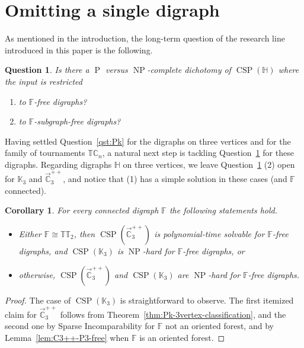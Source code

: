 \documentclass{article}
\newtheorem{corollary}[theorem]{Corollary}
\newtheorem{question}{Question}
\theoremstyle{definition}
\theoremstyle{remark}
\DeclareMathOperator{\NP}{NP}
\DeclareMathOperator{\cP}{P}
\DeclareMathOperator{\CSP}{CSP}
\newcommand{\bC}{{\mathbb C}}
\newcommand{\bF}{{\mathbb F}}
\newcommand{\bH}{{\mathbb H}}
\newcommand{\bK}{{\mathbb K}}
\newcommand{\bT}{{\mathbb T}}
\begin{document}
\section{Omitting a single digraph}
\label{sect:single-digraph}

As mentioned in the introduction, the long-term question of the research line introduced in 
this paper is the following.

\begin{question}\label{qst:long-term}
    Is there a $\cP$ versus $\NP$-complete dichotomy of $\CSP(\bH)$ where the input
    is restricted 
    \begin{enumerate}
        \item to $\bF$-free digraphs?
        \item to $\bF$-subgraph-free digraphs?
    \end{enumerate}
\end{question}

Having settled  Question~\ref{qst:Pk} for the digraphs on three vertices
and for the family of tournaments $\bT\bC_n$, a natural next step
is tackling Question~\ref{qst:long-term} for these digraphs.
Regarding digraphs $\bH$ on three vertices, we leave Question~\ref{qst:long-term} (2) 
open for $\bK_3$ and $\vec{\bC}_3^{++}$, and notice that (1) has a simple solution in
these cases (and $\bF$ connected). 



\begin{corollary}
    For every connected digraph $\bF$ the following statements hold.
    \begin{itemize}
        \item Either $\bF \cong \bT\bT_2$, then $\CSP(\vec{\bC}_3^{++})$ is polynomial-time solvable
        for $\bF$-free digraphs, and $\CSP(\bK_3)$ is $\NP$-hard for $\bF$-free digraphs, or
        \item otherwise, $\CSP(\vec{\bC}_3^{++})$ and $\CSP(\bK_3)$ are $\NP$-hard for 
        $\bF$-free digraphs. 
    \end{itemize}
\end{corollary}
\begin{proof}
    The case of $\CSP(\bK_3)$ is straightforward to observe. The first itemized
    claim for $\vec{\bC}_3^{++}$ follows from Theorem~\ref{thm:Pk-3vertex-classification},
    and the second one by Sparse Incomparability for $\bF$ not an oriented forest,
    and by Lemma~\ref{lem:C3++-P3-free} when $\bF$ is an oriented forest. 
\end{proof}
\end{document}
